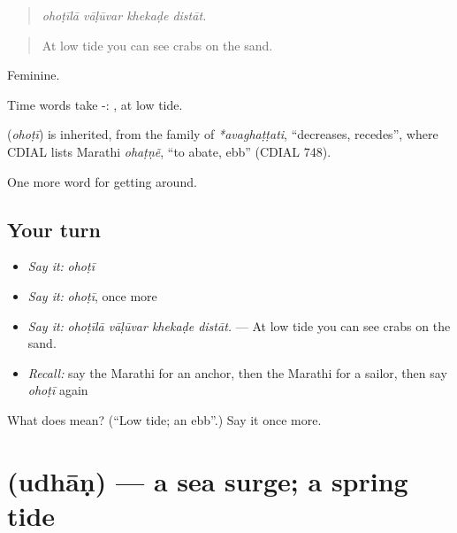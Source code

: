 \begin{quote}
\emph{ohoṭīlā vāḷūvar khekaḍe distāt.}
\end{quote}

\begin{quote}
At low tide you can see crabs on the sand.
\end{quote}

Feminine.

Time words take -: , at low tide.

\begin{cousinweb}
\textbf{} (\emph{ohoṭī}) is inherited, from the family of \emph{*avaghaṭṭati}, \textquotedblleft{}decreases, recedes\textquotedblright{}, where CDIAL lists Marathi \emph{ohaṭṇẽ}, \textquotedblleft{}to abate, ebb\textquotedblright{} (CDIAL 748).
\end{cousinweb}

\begin{grammarlens}[title={What you've built}]
One more word for getting around.
\end{grammarlens}

\subsection*{Your turn}
\begin{itemize}
\raggedright
  \item \emph{Say it:} \emph{ohoṭī}
  \item \emph{Say it:} \emph{ohoṭī}, once more
  \item \emph{Say it:} \emph{ohoṭīlā vāḷūvar khekaḍe distāt.} — At low tide you can see crabs on the sand.
  \item \emph{Recall:} say the Marathi for an anchor, then the Marathi for a sailor, then say \emph{ohoṭī} again
\end{itemize}

\begin{tcolorbox}[breakable,colback=teal!4,colframe=teal!35!black,title={Before you move on}]
What does  mean? (\textquotedblleft{}Low tide; an ebb\textquotedblright{}.) Say it once more.
\end{tcolorbox}
\section[\texorpdfstring{\mr{उधाण} (udhāṇ)}{उधाण (udhāṇ)}]{ (udhāṇ) — a sea surge; a spring tide}

\label{lesson:MR-C409-udhan}



